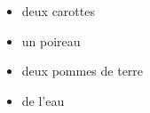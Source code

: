 \documentclass{beamer}
\begin{document}
   \begin{frame}
    \begin{itemize}
       \item deux carottes
           \item un poireau
           \item deux pommes de terre
           \item de l'eau

    \end{itemize}
   \end{frame}
\end{document}
